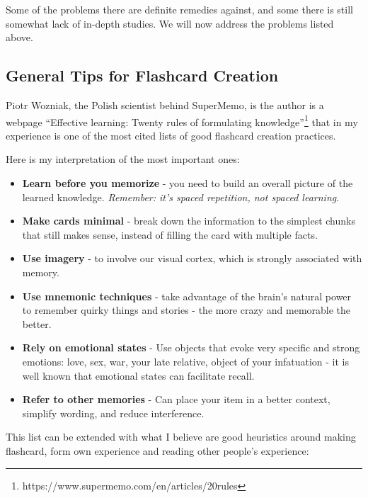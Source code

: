 Some of the problems there are definite remedies against, and some there
is still somewhat lack of in-depth studies. We will now address the
problems listed above.

\subsection{General Tips for Flashcard
Creation}\label{general-tips-for-flashcard-creation}

Piotr Wozniak, the Polish scientist behind SuperMemo, is the author is a
webpage ``Effective learning: Twenty rules of formulating
knowledge''\footnote{https://www.supermemo.com/en/articles/20rules} that
in my experience is one of the most cited lists of good flashcard
creation practices.

Here is my interpretation of the most important ones:

\begin{itemize}
\tightlist
\item
  \textbf{Learn before you memorize} - you need to build an overall
  picture of the learned knowledge. \emph{Remember: it's spaced
  repetition, not spaced learning}.
\item
  \textbf{Make cards minimal} - break down the information to the
  simplest chunks that still makes sense, instead of filling the card
  with multiple facts.
\item
  \textbf{Use imagery} - to involve our visual cortex, which is strongly
  associated with memory.
\item
  \textbf{Use mnemonic techniques} - take advantage of the brain's
  natural power to remember quirky things and stories - the more crazy
  and memorable the better.
\item
  \textbf{Rely on emotional states} - Use objects that evoke very
  specific and strong emotions: love, sex, war, your late relative,
  object of your infatuation - it is well known that emotional states
  can facilitate recall.
\item
  \textbf{Refer to other memories} - Can place your item in a better
  context, simplify wording, and reduce interference.
\end{itemize}

This list can be extended with what I believe are good heuristics around
making flashcard, form own experience and reading other people's
experience:

